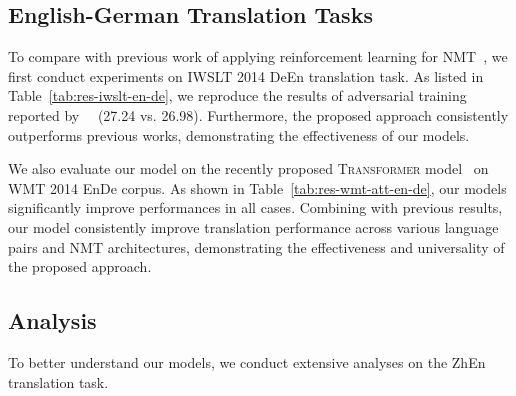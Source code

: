 \documentclass[letterpaper]{article} \usepackage{aaai19}  \usepackage{times}  \usepackage{helvet}  \usepackage{courier}  \usepackage{url}  \usepackage{graphicx}  \frenchspacing  \setlength{\pdfpagewidth}{8.5in}  \setlength{\pdfpageheight}{11in}  \usepackage{amsmath}
\begin{document}
\subsection{English-German Translation Tasks}

To compare with previous work of applying reinforcement learning for NMT~\cite{Ranzato:2016:ICLR,bahdanau2016actor,Wiseman:2016:EMNLP,wu2017adversarial}, we first conduct experiments on IWSLT 2014 DeEn translation task. As listed in Table~\ref{tab:res-iwslt-en-de}, we reproduce the results of adversarial training reported by~\citeauthor{wu2017adversarial}~ (27.24 vs. 26.98). Furthermore, the proposed approach consistently outperforms previous works, demonstrating the effectiveness of our models.


We also evaluate our model on the recently proposed \textsc{Transformer} model~\cite{vaswani2017attention} on WMT 2014 EnDe corpus. As shown in Table~\ref{tab:res-wmt-att-en-de}, our models significantly improve performances in all cases.
Combining with previous results, our model consistently improve translation performance across various language pairs and NMT architectures, demonstrating the effectiveness and universality of the proposed approach.



\iffalse
the WMT14 benchmarks for both German-English and English-German.
As shown in Table \ref{tab:res-wmt-en-de}, our model (\emph{i.e.,}\xspace ``{+{\bf \em D}+{\bf \em O}}'') improves performances in all cases,
demonstrating the efficiency and universality of the proposed approach across language pairs.
In addition, \textsc{Cdr} score consistently outperforms \textsc{Bleu} score even the latter uses 25 samples, proving the superiority of the proposed metric.
The best performance we achieve is also comparable with the reported results on the same data. 

Table~\ref{tab:res-iwslt-en-de} lists the result on the IWSLT data. We reproduced the result reported in~\cite{wu2017adversarial} (27.24 vs. 26.98). The proposed adequacy learning approach consistently outperforms previously reported results.
\fi



\subsection{Analysis}

To better understand our models, we conduct extensive analyses on the ZhEn translation task. 
\end{document}

